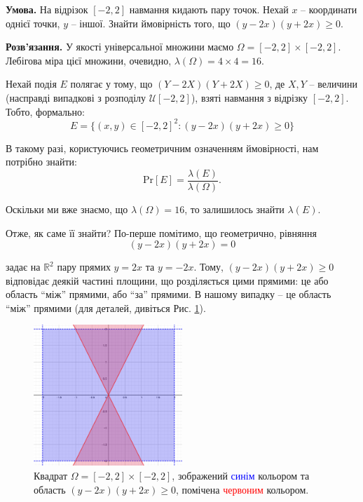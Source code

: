 \documentclass[oneside,solution]{karazin-prob-theory-assign}
\begin{document}

\textbf{Умова.} На відрізок $[-2,2]$ навмання кидають пару точок. Нехай $x$ -- координати однієї точки, $y$ -- іншої. Знайти ймовірність того, що $(y-2x)(y+2x) \geq 0$.

\textbf{Розв'язання.} У якості універсальної множини маємо $\Omega = [-2,2] \times [-2,2]$. Лебігова міра цієї множини, очевидно, $\lambda(\Omega) = 4 \times 4 = 16$. 

Нехай подія $E$ полягає у тому, що $(Y-2X)(Y+2X) \geq 0$, де $X,Y$ -- величини (насправді випадкові з розподілу $\mathcal{U}[-2,2]$), взяті навмання з відрізку $[-2,2]$. Тобто, формально: 
\begin{equation}
    E = \{(x,y) \in [-2,2]^2: (y-2x)(y+2x) \geq 0\}
\end{equation}

В такому разі, користуючись геометричним означенням ймовірності, нам потрібно знайти:
\begin{equation}
    \text{Pr}[E] = \frac{\lambda(E)}{\lambda(\Omega)}.
\end{equation}

Оскільки ми вже знаємо, що $\lambda(\Omega) = 16$, то залишилось знайти $\lambda(E)$. 

Отже, як саме її знайти? По-перше помітимо, що геометрично, рівняння
\begin{equation}
    (y-2x)(y+2x) = 0
\end{equation}

задає на $\mathbb{R}^2$ пару прямих $y=2x$ та $y=-2x$. Тому, $(y-2x)(y+2x) \geq 0$ відповідає деякій частині площини, що розділяється цими прямими: це або область ``між'' прямими, або ``за'' прямими. В нашому випадку -- це область ``між'' прямими (для деталей, дивіться Рис. \ref{fig:problem_3_illustration}).

\begin{figure}
    \centering
    \includegraphics[width=0.5\textwidth]{test_1_problem_3.png}
    \caption{Квадрат $\Omega = [-2,2]\times[-2,2]$, зображений \textcolor{blue}{синім} кольором та область $(y-2x)(y+2x) \geq 0$, помічена \textcolor{red}{червоним} кольором.}
    \label{fig:problem_3_illustration}
\end{figure}
\end{document}
